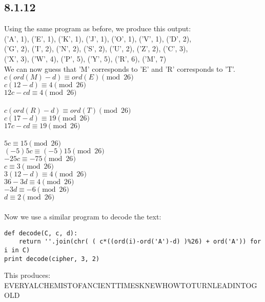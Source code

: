 \documentclass{article}
\begin{document}
\subsection{8.1.12}
Using the same program as before, we produce this output:
\\('A', 1), ('E', 1), ('K', 1), ('J', 1), ('O', 1), ('V', 1), ('D', 2),
\\('G', 2), ('I', 2), ('N', 2), ('S', 2), ('U', 2), ('Z', 2), ('C', 3),
\\('X', 3), ('W', 4), ('P', 5), ('Y', 5), ('R', 6), ('M', 7)
\\We can now guess that 'M' corresponds to 'E' and 'R' corresponds to 'T'.
\\$c(ord(M)-d) \equiv ord(E) \pmod{26}$
\\$c(12-d) \equiv 4 \pmod{26}$
\\$12c-cd \equiv 4 \pmod{26}$
\\
\\$c(ord(R)-d) \equiv ord(T) \pmod{26}$
\\$c(17-d) \equiv 19 \pmod{26}$
\\$17c-cd \equiv 19 \pmod{26}$
\\
\\$5c \equiv 15 \pmod{26}$
\\$(-5)5c \equiv (-5)15 \pmod{26}$
\\$-25c \equiv -75 \pmod{26}$
\\$c \equiv 3 \pmod{26}$
\\$3(12-d) \equiv 4 \pmod{26}$
\\$36-3d \equiv 4 \pmod{26}$
\\$-3d \equiv -6 \pmod{26}$
\\$d \equiv 2 \pmod{26}$
\\
\\Now we use a similar program to decode the text:
\begin{lstlisting}
def decode(C, c, d):
    return ''.join(chr( ( c*((ord(i)-ord('A')-d) )%26) + ord('A')) for i in C)
print decode(cipher, 3, 2)
\end{lstlisting}
This produces:
\\EVERYALCHEMISTOFANCIENTTIMESKNEWHOWTOTURNLEADINTOGOLD
\end{document}
